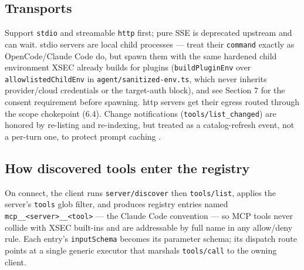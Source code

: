 \documentclass[11pt]{article}
\begin{document}
\subsection{Transports}

Support \texttt{stdio} and streamable \texttt{http} first; pure SSE is deprecated
upstream \cite{claudecode-mcp} and can wait. stdio servers are local child
processes --- treat their \texttt{command} exactly as OpenCode/Claude Code do,
but spawn them with the same hardened child environment XSEC already builds for
plugins (\texttt{buildPluginEnv} over \texttt{allowlistedChildEnv} in
\texttt{agent/sanitized-env.ts}, which never inherits provider/cloud credentials
or the target-auth block), and see Section 7 for the consent requirement before
spawning. http servers get
their egress routed through the scope chokepoint (6.4). Change notifications
(\texttt{tools/list\_changed}) are honored by re-listing and re-indexing, but
treated as a catalog-refresh event, not a per-turn one, to protect prompt
caching \cite{mcp-clientbp}.

\subsection{How discovered tools enter the registry}

On connect, the client runs \texttt{server/discover} then \texttt{tools/list},
applies the server's \texttt{tools} glob filter, and produces registry entries
named \texttt{mcp\_\_<server>\_\_<tool>} --- the Claude Code convention
\cite{claudecode-mcp} --- so MCP tools never collide with XSEC built-ins and are
addressable by full name in any allow/deny rule. Each entry's
\texttt{inputSchema} becomes its parameter schema; its dispatch route points at a
single generic executor that marshals \texttt{tools/call} to the owning client.
\end{document}
